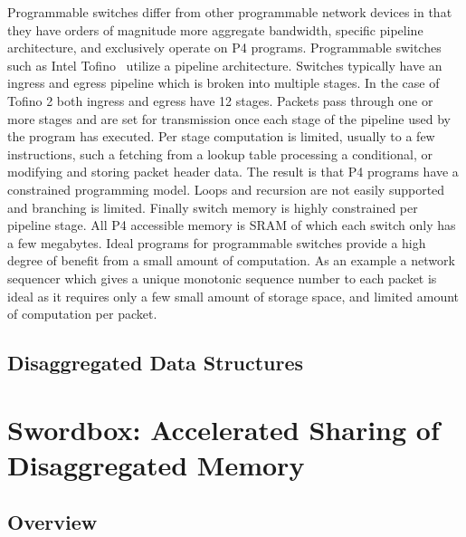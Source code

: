 \documentclass[12pt]{ucsddissertation}
\begin{document}
Programmable switches differ from other programmable network devices in that they have orders of
magnitude more aggregate bandwidth, specific pipeline architecture, and exclusively operate on P4
programs.
Programmable switches such as Intel Tofino~\cite{tofino2} utilize a pipeline architecture. Switches
typically have an ingress and egress pipeline which is broken into multiple stages. In the case of
Tofino 2 both ingress and egress have 12 stages. Packets pass through one or more stages and are set
for transmission once each stage of the pipeline used by the program has executed. Per stage
computation is limited, usually to a few instructions, such a fetching from a lookup table
processing a conditional, or modifying and storing packet header data. The result is that P4
programs have a constrained programming model. Loops and recursion are not easily supported and
branching is limited. Finally switch memory is highly constrained per pipeline stage. All P4
accessible memory is SRAM of which each switch only has a few megabytes.
Ideal programs for programmable switches provide a high degree of benefit from a small amount of
computation. As an example a network sequencer which gives a unique monotonic sequence number to
each packet is ideal as it requires only a few small amount of storage space, and limited amount of
computation per packet.

\section{Disaggregated Data Structures}



\chapter{Swordbox: Accelerated Sharing of Disaggregated Memory}
\label{chap:swordbox}









\section{Overview}


\end{document}
